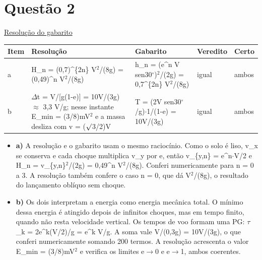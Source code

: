 \documentclass{article}%
\begin{document}
\section*{Questão 2}%
\href{https://poliedroresolve.sistemapoliedro.com.br/vestibulares/ita/2027/ita-2-fase-dia-3-22-10-2026-2-fase-dia-3/dissertativa-2-fisica-2-fase-dia-3-ita-2027}{Resolução do gabarito}\par\smallskip%
\begin{longtable}{@{}p{} p{} p{} p{} p{}@{}}\toprule Item & Resolução & Gabarito & Veredito & Certo \\ \midrule
a & H\_n = (0,7)\^{}\{2n\} V$^2$/(8g) = (0,49)\^{}n V$^2$/(8g) & h\_n = (e\^{}n V sen30$^\circ$)$^2$/(2g) = 0,7\^{}\{2n\} V$^2$/(8g) & igual & ambos \\
b & $\Delta$t = V/{[}g(1-e){]} = 10V/(3g) $\approx$ 3,3 V/g; nesse instante E\_min = (3/8)mV$^2$ e a massa desliza com v = ($\surd$3/2)V & T = (2V sen30$^\circ$/g)$\cdot$1/(1-e) = 10V/(3g) & igual & ambos \\
\bottomrule\end{longtable}%
\begin{itemize}%
\item%
\textbf{a)} A resolução e o gabarito usam o mesmo raciocínio. Como o solo é liso, v\_x se conserva e cada choque multiplica v\_y por e, então v\_\{y,n\} = e\^{}n$\cdot$V/2 e H\_n = v\_\{y,n\}$^2$/(2g) = 0,49\^{}n V$^2$/(8g). Conferi numericamente para n = 0 a 3. A resolução também confere o caso n = 0, que dá V$^2$/(8g), o resultado do lançamento oblíquo sem choque.%
\item%
\textbf{b)} Os dois interpretam a energia como energia mecânica total. O mínimo dessa energia é atingido depois de infinitos choques, mas em tempo finito, quando não resta velocidade vertical. Os tempos de voo formam uma PG: $\tau$\_k = 2e\^{}k(V/2)/g = e\^{}k V/g. A soma vale V/(0,3g) = 10V/(3g), o que conferi numericamente somando 200 termos. A resolução acrescenta o valor E\_min = (3/8)mV$^2$ e verifica os limites e$\to$0 e e$\to$1, ambos coerentes.%
\end{itemize}%
\end{document}
